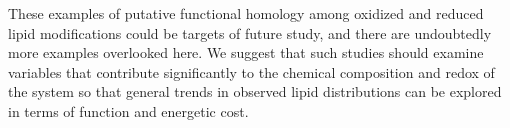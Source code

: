 These examples of putative functional homology among oxidized and reduced lipid modifications could be targets of future study, and there are undoubtedly more examples overlooked here. We suggest that such studies should examine variables that contribute significantly to the chemical composition and redox of the system so that general trends in observed lipid distributions can be explored in terms of function and energetic cost.









